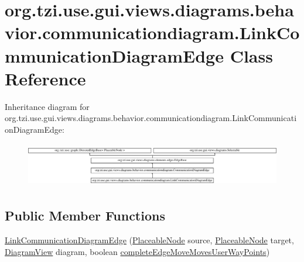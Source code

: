 \hypertarget{classorg_1_1tzi_1_1use_1_1gui_1_1views_1_1diagrams_1_1behavior_1_1communicationdiagram_1_1_link_communication_diagram_edge}{\section{org.\-tzi.\-use.\-gui.\-views.\-diagrams.\-behavior.\-communicationdiagram.\-Link\-Communication\-Diagram\-Edge Class Reference}
\label{classorg_1_1tzi_1_1use_1_1gui_1_1views_1_1diagrams_1_1behavior_1_1communicationdiagram_1_1_link_communication_diagram_edge}
}
Inheritance diagram for org.\-tzi.\-use.\-gui.\-views.\-diagrams.\-behavior.\-communicationdiagram.\-Link\-Communication\-Diagram\-Edge\-:\begin{figure}[H]
\begin{center}
\leavevmode
\includegraphics[height=1.982301cm]{classorg_1_1tzi_1_1use_1_1gui_1_1views_1_1diagrams_1_1behavior_1_1communicationdiagram_1_1_link_communication_diagram_edge}
\end{center}
\end{figure}
\subsection*{Public Member Functions}
\begin{DoxyCompactItemize}
\item 
\hyperlink{classorg_1_1tzi_1_1use_1_1gui_1_1views_1_1diagrams_1_1behavior_1_1communicationdiagram_1_1_link_communication_diagram_edge_aff7e73c01c947a564e58f1381d257724}{Link\-Communication\-Diagram\-Edge} (\hyperlink{classorg_1_1tzi_1_1use_1_1gui_1_1views_1_1diagrams_1_1elements_1_1_placeable_node}{Placeable\-Node} source, \hyperlink{classorg_1_1tzi_1_1use_1_1gui_1_1views_1_1diagrams_1_1elements_1_1_placeable_node}{Placeable\-Node} target, \hyperlink{classorg_1_1tzi_1_1use_1_1gui_1_1views_1_1diagrams_1_1_diagram_view}{Diagram\-View} diagram, boolean \hyperlink{classorg_1_1tzi_1_1use_1_1gui_1_1views_1_1diagrams_1_1elements_1_1edges_1_1_edge_base_ad97a3ce3074b08b65550e796d09f8e42}{complete\-Edge\-Move\-Moves\-User\-Way\-Points})
\end{DoxyCompactItemize}
